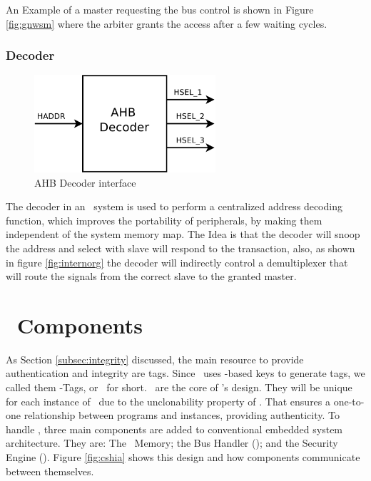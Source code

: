 An Example of a master requesting the bus control is shown in Figure \ref{fig:gnwsm} where the arbiter grants the access after a few waiting cycles.


\subsubsection{Decoder}

\begin{figure}[ht]
    \centering
    \includegraphics[width=0.6\textwidth]{figures/pdf/ahb_decoder_new.pdf}
    \caption{AHB Decoder interface}
    \label{fig:decoder int}
\end{figure}
 The decoder in an \amba~system is used to perform a centralized address decoding function, which improves the portability of peripherals, by making them independent of the system memory map. The Idea is that the decoder will snoop the address and select with slave will respond to the transaction, also, as shown in figure \ref{fig:internorg} the decoder will indirectly control a demultiplexer that will route the signals from the correct slave to the granted master.

 

\section{\cshia~Components}
\label{sec:Components-of-the-Architecture}
As Section \ref{subsec:integrity} discussed, the main resource to provide authentication and integrity are tags. Since \cshia~uses \puf-based keys to generate tags, we called them \puf-Tags, or \ptags~for short. \ptags~are the core of \cshia's design. They will be unique for each instance of \cshia~due to the unclonability property of \pufs. That ensures a one-to-one relationship between programs and instances, providing authenticity. To handle \ptags, three main components are added to conventional embedded system architecture. They are: The \ptag~Memory; the Bus Handler (\handler); and the Security Engine (\seceng). Figure \ref{fig:cshia} shows this design and how components communicate between themselves. 


